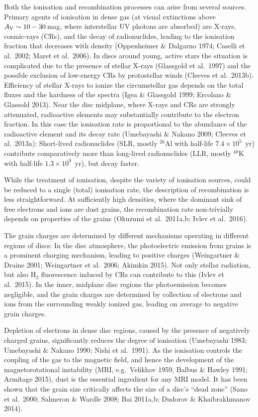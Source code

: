 \documentclass[10pt,fleqn,twoside]{article}
\begin{document}
Both the ionisation and recombination processes can arise from several sources. Primary agents of ionisation in dense gas
(at visual extinctions above $A_{\rm V}\sim 10-30$\,mag, where interstellar UV photons are absorbed) are X-rays, cosmic-rays (CRs), and the decay of radionuclides, leading to the ionisation fraction that decreases with density (Oppenheimer \& Dalgarno 1974; Caselli et al.\ 2002; Maret et al.\ 2006). In discs around young, active stars the situation is complicated due to the presence of stellar X-rays (Glassgold et al.\ 1997) and the possible exclusion of low-energy CRs by protostellar winds (Cleeves et al.\ 2013b). Efficiency of stellar X-rays to ionize the circumstellar gas depends on the total fluxes and the hardness of the spectra (Igea \& Glassgold 1999; Ercolano \& Glassold 2013). Near the disc midplane, where X-rays and CRs are strongly attenuated, radioactive elements may substantially contribute to the electron fraction. In this case the ionisation rate is proportional to the abundance of the radioactive element and its decay rate (Umebayashi \& Nakano 2009; Cleeves et al.\ 2013a): Short-lived radionuclides (SLR, mostly $^{26}$Al with half-life $7.4\times 10^5$~yr) contribute comparatively more than long-lived radionuclides (LLR, mostly $^{40}$K with half-life $1.3\times 10^9$~yr), but decay faster.

While the treatment of ionisation, despite the variety of ionisation sources, could be reduced to a single (total)
ionisation rate, the description of recombination is less straightforward. At sufficiently high densities, where the
dominant sink of free electrons and ions are dust grains, the recombination rate non-trivially depends on properties of the
grains (Okuzumi et al.\ 2011a,b; Ivlev et al.\ 2016).

The grain charges are determined by different mechanisms operating in different regions of discs: In the disc atmosphere, the
photoelectric emission from grains is a prominent charging mechanism, leading to positive charges (Weingartner \& Draine 2001; Weingartner et al.\ 2006; Akimkin 2015). Not only stellar radiation, but also H$_2$ fluorescence induced by CRs can contribute to this (Ivlev et al.\ 2015). In the inner, midplane disc regions the photoemission becomes negligible, and the grain charges are determined by collection of electrons and ions from the surrounding weakly ionized gas, leading on average to negative grain charges.

Depletion of electrons in dense disc regions, caused by the presence of negatively charged grains, significantly reduces the
degree of ionisation (Umebayashi 1983; Umebayashi \& Nakano 1990; Nishi et al.\ 1991). As the ionisation controls the coupling of the gas to the magnetic field, and hence the development of the magnetorotational instability (MRI, e.g.\ Velikhov 1959, Balbus \& Hawley 1991; Armitage 2015), dust is the essential ingredient for any MRI model. It has been shown that the grain size critically affects the size of a disc's ``dead zone'' (Sano et al.\ 2000; Salmeron \& Wardle 2008; Bai 2011a,b; Dudorov \& Khaibrakhmanov 2014).
\end{document}
